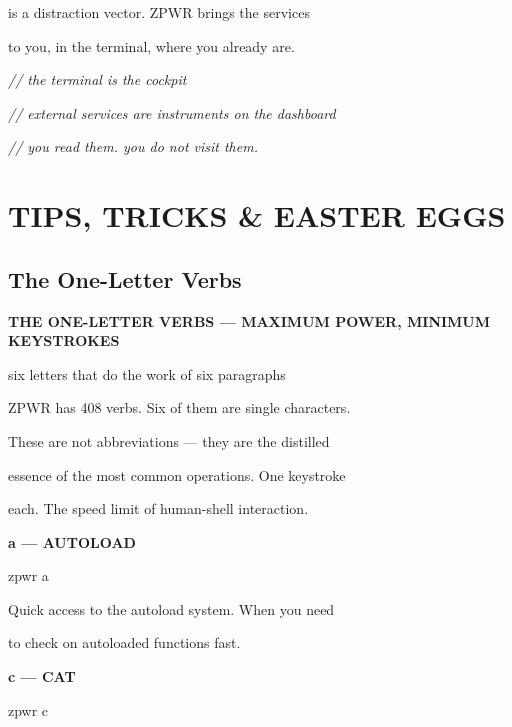\documentclass[11pt,a4paper,twoside]{book}
\begin{document}
is a distraction vector. ZPWR brings the services

to you, in the terminal, where you already are.

{\small\itshape\color{dimtext} // the terminal is the cockpit}

{\small\itshape\color{dimtext} // external services are instruments on the dashboard}

{\small\itshape\color{dimtext} // you read them. you do not visit them.}


\vspace{16pt}


\chapter{TIPS, TRICKS \& EASTER EGGS}

\section{The One-Letter Verbs}


\vspace{10pt}
{\large\bfseries\color{neoncyan} THE ONE-LETTER VERBS — MAXIMUM POWER, MINIMUM KEYSTROKES}\vspace{6pt}

six letters that do the work of six paragraphs

ZPWR has 408 verbs. Six of them are single characters.

These are not abbreviations — they are the distilled

essence of the most common operations. One keystroke

each. The speed limit of human-shell interaction.


\vspace{12pt}
{\bfseries\color{neonyellow} a — AUTOLOAD}\vspace{4pt}

\begin{codebox}
zpwr a\\
\end{codebox}

Quick access to the autoload system. When you need

to check on autoloaded functions fast.


\vspace{12pt}
{\bfseries\color{neonyellow} c — CAT}\vspace{4pt}

\begin{codebox}
zpwr c\\
\end{codebox}
\end{document}
